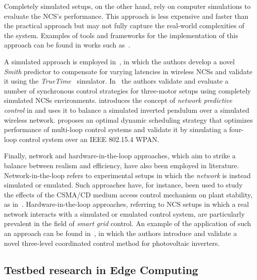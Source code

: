 Completely simulated setups, on the other hand, rely on computer simulations to evaluate the \gls{NCS}'s performance.
This approach is less expensive and faster than the practical approach but may not fully capture the real-world complexities of the system.
Examples of tools and frameworks for the implementation of this approach can be found in works such as~\cite{andersson2005simulation,eyisi2012ncswt}.

A simulated approach is employed in~\cite{du2009novel}, in which the authors develop a novel \emph{Smith} predictor to compensate for varying latencies in wireless \glspl{NCS} and validate it using the \emph{TrueTime}~\cite{henriksson2002truetime} simulator.
In~\cite{chen2015synchronous} the authors validate and evaluate a number of synchronous control strategies for three-motor setups using completely simulated \glspl{NCS} environments.\@
\cite{wu2012application} introduces the concept of \emph{network predictive control} in and uses it to balance a simulated inverted pendulum over a simulated wireless network.\@
\cite{ma2019optimal} proposes an optimal dynamic scheduling strategy that optimizes performance of multi-loop control systems and validate it by simulating a four-loop control system over an \acs{IEEE} 802.15.4 \gls{WPAN}.

Finally, network and hardware-in-the-loop approaches, which aim to strike a balance between realism and efficiency, have also been employed in literature.
Network-in-the-loop refers to experimental setups in which the \emph{network} is instead simulated or emulated.
Such approaches have, for instance, been used to study the effects of the \gls{CSMA/CD} medium access control mechanism on plant stability, as in~\cite{natale2004inverted}.
Hardware-in-the-loop approaches, referring to \gls{NCS} setups in which a real network interacts with a simulated or emulated control system, are particularly prevalent in the field of \emph{smart grid} control.
An example of the application of such an approach can be found in~\cite{wang2020inverter}, in which the authors introduce and validate a novel three-level coordinated control method for photovoltaic inverters.

\subsection{Testbed research in Edge Computing}


